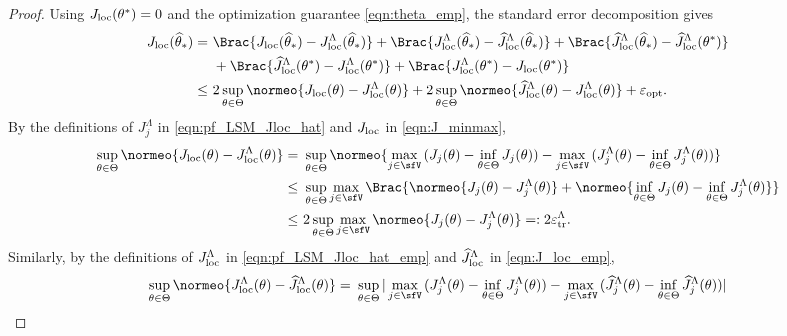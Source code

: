 \documentclass[11pt]{article}
\begin{document}
\begin{proof}
Using $J_{\rm loc}(\theta^*) = 0$ and the optimization guarantee \eqref{eqn:theta_emp}, the standard error decomposition gives
\begin{equation}
\label{eqn:pf_LSM_err_decomp}
\begin{split}
    J_{\rm loc} (\widehat{\theta}_*) =~& \Brac{ J_{\rm loc} (\widehat{\theta}_*) - J_{\rm loc}^\Lambda (\widehat{\theta}_*) } + \Brac{ J_{\rm loc}^\Lambda (\widehat{\theta}_*) - \widehat{J}_{\rm loc}^\Lambda (\widehat{\theta}_*) } + \Brac{ \widehat{J}_{\rm loc}^\Lambda(\widehat{\theta}_*) - \widehat{J}_{\rm loc}^\Lambda(\theta^*) } \\
    &+ \Brac{ \widehat{J}_{\rm loc}^\Lambda (\theta^*) - J_{\rm loc}^\Lambda (\theta^*) } + \Brac{ J_{\rm loc}^\Lambda (\theta^*) - J_{\rm loc} (\theta^*) } \\
    \le~& 2 \sup_{\theta \in \Theta} \normeo{ J_{\rm loc}(\theta) - J_{\rm loc}^\Lambda(\theta) } + 2 \sup_{\theta \in \Theta} \normeo{ \widehat{J}_{\rm loc}^\Lambda(\theta) - J_{\rm loc}^\Lambda(\theta) } + \varepsilon_{\rm opt}.
\end{split}
\end{equation}
By the definitions of $J_j^\Lambda$ in \eqref{eqn:pf_LSM_Jloc_hat} and $J_{\rm loc}$ in \eqref{eqn:J_minmax},
\begin{align*}
    \sup_{\theta \in \Theta} \normeo{ J_{\rm loc}(\theta) - J_{\rm loc}^\Lambda(\theta) } =~& \sup_{\theta \in \Theta} \normeo{ \max_{j \in \sfV}\, ( J_j(\theta) - \inf_{\theta \in \Theta} J_j(\theta) ) - \max_{j \in \sfV}\, ( J_j^\Lambda(\theta) - \inf_{\theta \in \Theta} J_j^\Lambda(\theta) ) } \\
    \le~& \sup_{\theta \in \Theta} \max_{j \in \sfV} \Brac{ \normeo{ J_j(\theta) - J_j^\Lambda(\theta) } + \normeo{ \inf_{\theta \in \Theta} J_j(\theta)- \inf_{\theta \in \Theta} J_j^\Lambda(\theta) } } \\
    \le~& 2 \sup_{\theta \in \Theta} \max_{j \in \sfV} \normeo{ J_j(\theta) - J_j^\Lambda(\theta) } =: 2 \varepsilon_{\rm tr}^\Lambda.
\end{align*}
Similarly, by the definitions of $J_{\rm loc}^\Lambda$ in \eqref{eqn:pf_LSM_Jloc_hat_emp} and $\widehat{J}_{\rm loc}^\Lambda$ in \eqref{eqn:J_loc_emp},
\begin{equation}
\label{eqn:pf_LSM_J_diff}
\begin{split}
    \sup_{\theta \in \Theta} \normeo{ J_{\rm loc}^\Lambda (\theta) - \widehat{J}_{\rm loc}^\Lambda(\theta) } =~& \sup_{\theta \in \Theta} | \max_{j \in \sfV}\, ( J_j^\Lambda(\theta) - \inf_{\theta \in \Theta} J_j^\Lambda(\theta) ) - \max_{j \in \sfV}\, ( \widehat{J}_j^\Lambda(\theta) - \inf_{\theta \in \Theta} \widehat{J}_j^\Lambda(\theta) ) | \\

\end{split}
\end{equation}
\end{proof}
\end{document}
